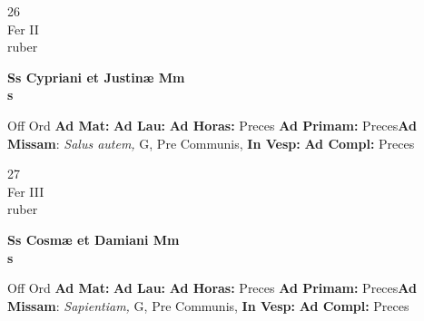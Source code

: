 \documentclass[10pt, openany]{book}
\begin{document}
        \begin{center}
            \begin{minipage}{3.5in}
                \vspace{2em}
                \begin{minipage}{0.5in}
                    {\Huge 26} \\
                    {\normalsize Fer II} \\
                    {\normalsize ruber}
                \end{minipage}
                \begin{minipage}{3.0in}
                    \textbf{ \large Ss Cypriani et Justinæ Mm \\
                    \textnormal{\normalsize s}} \\ 
                \end{minipage}
                \begin{justify}Off Ord
                    \textbf{Ad Mat: }
                    \textbf{Ad Lau: }
                    \textbf{Ad Horas: }Preces
                    \textbf{Ad Primam: }Preces\textbf{Ad Missam}: \textit{Salus autem,} G, Pre Communis,  
                    \textbf{In Vesp: }
                    \textbf{Ad Compl: }Preces
                \end{justify}
            \end{minipage}
        \end{center}
    
        \begin{center}
            \begin{minipage}{3.5in}
                \vspace{2em}
                \begin{minipage}{0.5in}
                    {\Huge 27} \\
                    {\normalsize Fer III} \\
                    {\normalsize ruber}
                \end{minipage}
                \begin{minipage}{3.0in}
                    \textbf{ \large Ss Cosmæ et Damiani Mm \\
                    \textnormal{\normalsize s}} \\ 
                \end{minipage}
                \begin{justify}Off Ord
                    \textbf{Ad Mat: }
                    \textbf{Ad Lau: }
                    \textbf{Ad Horas: }Preces
                    \textbf{Ad Primam: }Preces\textbf{Ad Missam}: \textit{Sapientiam,} G, Pre Communis,  
                    \textbf{In Vesp: }
                    \textbf{Ad Compl: }Preces
                \end{justify}
            \end{minipage}
        \end{center}
    
\end{document}
